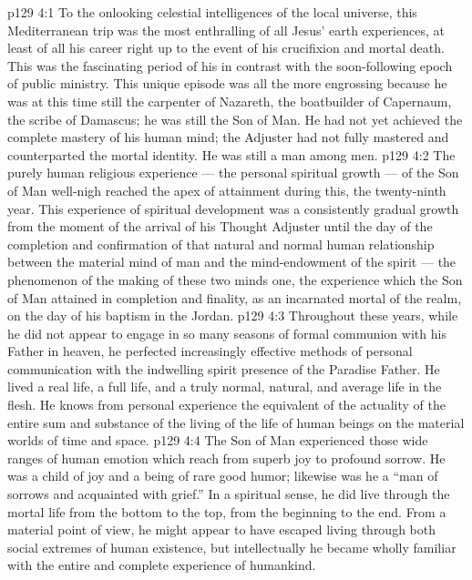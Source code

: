 \vs p129 4:1 To the onlooking celestial intelligences of the local universe, this Mediterranean trip was the most enthralling of all Jesus’ earth experiences, at least of all his career right up to the event of his crucifixion and mortal death. This was the fascinating period of his  in contrast with the soon\hyp{}following epoch of public ministry. This unique episode was all the more engrossing because he was at this time still the carpenter of Nazareth, the boatbuilder of Capernaum, the scribe of Damascus; he was still the Son of Man. He had not yet achieved the complete mastery of his human mind; the Adjuster had not fully mastered and counterparted the mortal identity. He was still a man among men.
\vs p129 4:2 The purely human religious experience --- the personal spiritual growth --- of the Son of Man well\hyp{}nigh reached the apex of attainment during this, the twenty\hyp{}ninth year. This experience of spiritual development was a consistently gradual growth from the moment of the arrival of his Thought Adjuster until the day of the completion and confirmation of that natural and normal human relationship between the material mind of man and the mind\hyp{}endowment of the spirit --- the phenomenon of the making of these two minds one, the experience which the Son of Man attained in completion and finality, as an incarnated mortal of the realm, on the day of his baptism in the Jordan.
\vs p129 4:3 Throughout these years, while he did not appear to engage in so many seasons of formal communion with his Father in heaven, he perfected increasingly effective methods of personal communication with the indwelling spirit presence of the Paradise Father. He lived a real life, a full life, and a truly normal, natural, and average life in the flesh. He knows from personal experience the equivalent of the actuality of the entire sum and substance of the living of the life of human beings on the material worlds of time and space.
\vs p129 4:4 The Son of Man experienced those wide ranges of human emotion which reach from superb joy to profound sorrow. He was a child of joy and a being of rare good humor; likewise was he a “man of sorrows and acquainted with grief.” In a spiritual sense, he did live through the mortal life from the bottom to the top, from the beginning to the end. From a material point of view, he might appear to have escaped living through both social extremes of human existence, but intellectually he became wholly familiar with the entire and complete experience of humankind.
